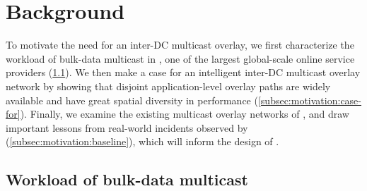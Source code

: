 \section{Background}
\label{sec:motivation}


To motivate the need for an inter-DC multicast overlay,
we first characterize the workload of bulk-data multicast in
\company, one of the largest global-scale online service 
providers (\Section\ref{subsec:motivation:multicast-traffic}).
We then make a case for an intelligent inter-DC multicast
overlay network by showing that disjoint application-level
overlay paths are widely available and have great spatial
diversity in performance
(\Section\ref{subsec:motivation:case-for}).
Finally, we examine the existing multicast overlay networks
of \company, and draw important lessons from real-world incidents
observed by \company (\Section\ref{subsec:motivation:baseline}),
which will inform the design of \name.


\subsection{Workload of bulk-data multicast}
\label{subsec:motivation:multicast-traffic}

